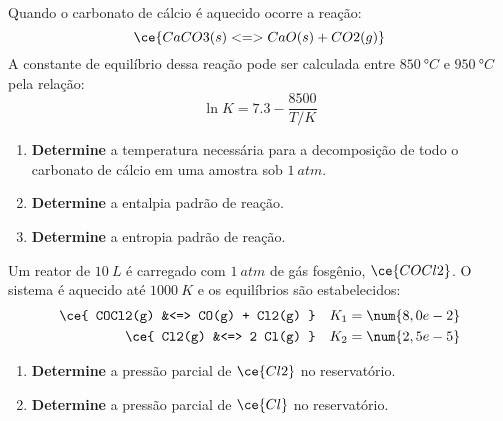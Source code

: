 \begin{problem}[
	id={2F66},
	path={/home/braun/Documents/Developer/braunchem/data/problems/Q2/2F/2F66}
]
Quando o carbonato de cálcio é aquecido ocorre a reação: {\[
    \ce{ CaCO3(s) <=> CaO(s) + CO2(g) }
\]} A constante de equilíbrio dessa reação pode ser calculada entre {\(\qty{850}{\unit{\degree C}}\)} e {\(\qty{950}{\unit{\degree C}}\)} pela
relação: {\[
    \ln K = \num{7,3} - \dfrac{ \num{8500} }{ T/\unit{K} }
\]}

\begin{enumerate}
\def\labelenumi{\alph{enumi}.}
\tightlist
\item
  \textbf{Determine} a temperatura necessária para a decomposição de todo o carbonato de cálcio em uma amostra sob {\(\qty{1}{\unit{atm}}\)}.
\item
  \textbf{Determine} a entalpia padrão de reação.
\item
  \textbf{Determine} a entropia padrão de reação.
\end{enumerate}

\end{problem}


\begin{problem}[
	id={2F67},
	path={/home/braun/Documents/Developer/braunchem/data/problems/Q2/2F/2F67}
]
Um reator de {\(\qty{10}{\unit{L}}\)} é carregado com {\(\qty{1}{\unit{atm}}\)} de gás fosgênio, {\(\ce{COCl2}\)}. O sistema é aquecido até
{\(\qty{1000}{\unit{K}}\)} e os equilíbrios são estabelecidos: {\[
\begin{aligned}
    \ce{ COCl2(g) &<=> CO(g) + Cl2(g) } && K_1 =
\num{8,0e-2} \\
    \ce{ Cl2(g) &<=> 2 Cl(g) } && K_2 = \num{2,5e-5}
\end{aligned}
\]}

\begin{enumerate}
\def\labelenumi{\alph{enumi}.}
\tightlist
\item
  \textbf{Determine} a pressão parcial de {\(\ce{Cl2}\)} no reservatório.
\item
  \textbf{Determine} a pressão parcial de {\(\ce{Cl}\)} no reservatório.
\end{enumerate}

\end{problem}


